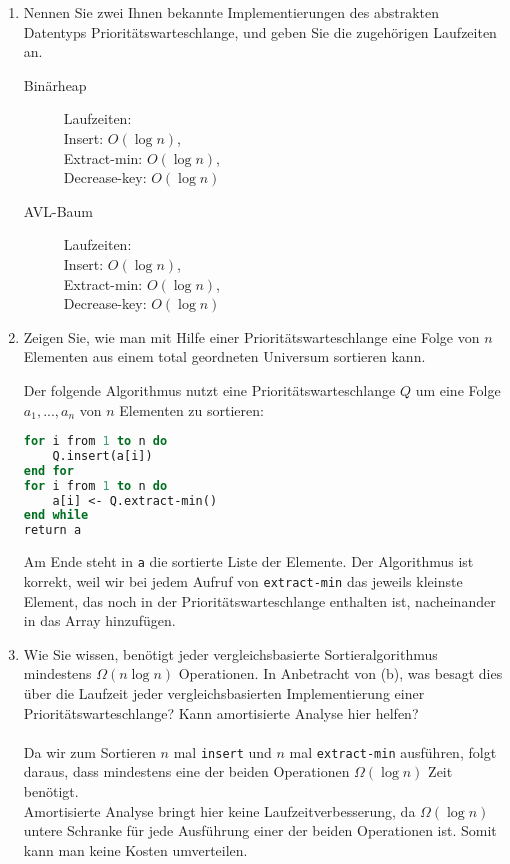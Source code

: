 \documentclass[11pt,a4paper,ngerman]{article}
\begin{document}
\begin{enumerate}[\bfseries a)]

\item Nennen Sie zwei Ihnen bekannte Implementierungen des abstrakten Datentyps Prioritätswarteschlange, und geben Sie die zugehörigen Laufzeiten an.

\begin{description}
\item[Binärheap] Laufzeiten: \\
Insert: $O(\log n)$, \\
Extract-min: $O(\log n)$, \\
Decrease-key: $O(\log n)$
\item[AVL-Baum] Laufzeiten: \\
Insert: $O(\log n)$, \\
Extract-min: $O(\log n)$, \\
Decrease-key: $O(\log n)$
\end{description}


\item Zeigen Sie, wie man mit Hilfe einer Prioritätswarteschlange eine Folge von $n$ Elementen aus einem total geordneten Universum sortieren kann.

Der folgende Algorithmus nutzt eine Prioritätswarteschlange $Q$ um eine Folge $a_1, ..., a_n$ von $n$ Elementen zu sortieren:

\begin{lstlisting}[language=Pascal]
for i from 1 to n do
	Q.insert(a[i])
end for
for i from 1 to n do
	a[i] <- Q.extract-min()
end while
return a
\end{lstlisting}

Am Ende steht in \texttt{a} die sortierte Liste der Elemente. Der Algorithmus ist korrekt, weil wir bei jedem Aufruf von \texttt{extract-min} das jeweils kleinste Element, das noch in der Prioritätswarteschlange enthalten ist, nacheinander in das Array hinzufügen.

\item Wie Sie wissen, benötigt jeder vergleichsbasierte Sortieralgorithmus mindestens $\Omega(n \log n)$ Operationen. In Anbetracht von (b), was besagt dies über die Laufzeit jeder vergleichsbasierten Implementierung einer Prioritätswarteschlange?
Kann amortisierte Analyse hier helfen?
\\ \\
Da wir zum Sortieren $n$ mal \texttt{insert} und $n$ mal \texttt{extract-min} ausführen, folgt daraus, dass mindestens eine der beiden Operationen $\Omega(\log n)$ Zeit benötigt.\\
Amortisierte Analyse bringt hier keine Laufzeitverbesserung, da $\Omega(\log n)$ untere Schranke für jede Ausführung einer der beiden Operationen ist. Somit kann man keine Kosten umverteilen.
\end{enumerate}

\label{LastPage}
\end{document}
